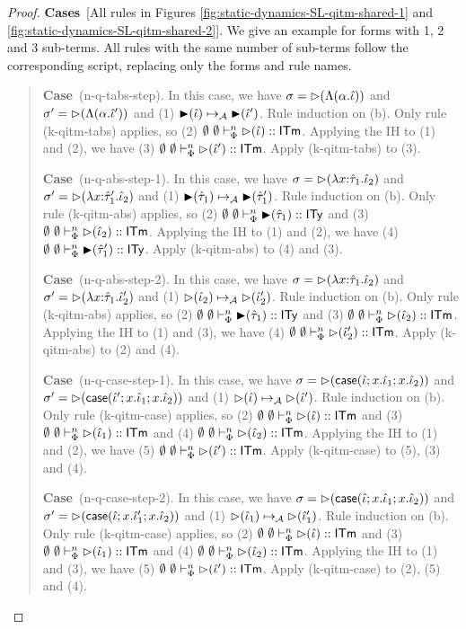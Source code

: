 \documentclass[12pt]{article}
\newcommand{\pfcase}[1]{\textbf{Case}~#1. }
\newcommand{\pfcases}[1]{\textbf{Cases}~#1. }
\begin{document}
\begin{proof}
\pfcases{[All rules in Figures \ref{fig:static-dynamics-SL-qitm-shared-1} and \ref{fig:static-dynamics-SL-qitm-shared-2}]} We give an example for forms with 1, 2 and 3 sub-terms. All rules with the same number of sub-terms follow the corresponding script, replacing only the forms and rule names.

\begin{quote}
    \pfcase{(n-q-tabs-step)} In this case, we have $\st=\sqitm{\iLam{\alpha}{\qitm}}$ and $\st'=\sqitm{\iLam{\alpha}{\qitm'}}$ and (1) $\qtstep{\qitm}{\qitm'}$. Rule induction on (b). Only rule (k-qitm-tabs) applies, so (2) $\sofkVX{\sqitm{\qitm}}{\kitm}$. Applying the IH to (1) and (2), we have (3) $\sofkVX{\sqitm{\qitm'}}{\kitm}$. Apply (k-qitm-tabs) to (3). 

    \pfcase{(n-q-abs-step-1)} In this case, we have $\st=\sqitm{\ilam{\qity_1}{x}{\qitm_2}}$ and $\st'=\sqitm{\ilam{\qity_1'}{x}{\qitm_2}}$ and (1) $\qtstep{\qity_1}{\qity_1'}$. Rule induction on (b). Only rule (k-qitm-abs) applies, so (2) $\sofkVX{\sqity{\qity_1}}{\kity}$ and (3) $\sofkVX{\sqitm{\qitm_2}}{\kitm}$. Applying the IH to (1) and (2), we have (4) $\sofkVX{\sqity{\qity_1'}}{\kity}$. Apply (k-qitm-abs) to (4) and (3).

    \pfcase{(n-q-abs-step-2)} In this case, we have $\st=\sqitm{\ilam{\qity_1}{x}{\qitm_2}}$ and $\st'=\sqitm{\ilam{\qity_1}{x}{\qitm_2'}}$ and (1) $\qstep{\qitm_2}{\qitm_2'}$. Rule induction on (b). Only rule (k-qitm-abs) applies, so (2) $\sofkVX{\sqity{\qity_1}}{\kity}$ and (3) $\sofkVX{\sqitm{\qitm_2}}{\kitm}$. Applying the IH to (1) and (3), we have (4) $\sofkVX{\sqitm{\qitm_2'}}{\kitm}$. Apply (k-qitm-abs) to (2) and (4).

    \pfcase{(n-q-case-step-1)} In this case, we have $\st=\sqitm{\icase{\qitm}{x}{\qitm_1}{x}{\qitm_2}}$ and $\st'=\sqitm{\icase{\qitm'}{x}{\qitm_1}{x}{\qitm_2}}$ and (1) $\qstep{\qitm}{\qitm'}$. Rule induction on (b). Only rule (k-qitm-case) applies, so (2) $\sofkVX{\sqitm{\qitm}}{\kitm}$ and (3) $\sofkVX{\sqitm{\qitm_1}}{\kitm}$ and (4) $\sofkVX{\sqitm{\qitm_2}}{\kitm}$. Applying the IH to (1) and (2), we have (5) $\sofkVX{\sqitm{\qitm'}}{\kitm}$. Apply (k-qitm-case) to (5), (3) and (4). 

    \pfcase{(n-q-case-step-2)} In this case, we have $\st=\sqitm{\icase{\qitm}{x}{\qitm_1}{x}{\qitm_2}}$ and $\st'=\sqitm{\icase{\qitm}{x}{\qitm_1'}{x}{\qitm_2}}$ and (1) $\qstep{\qitm_1}{\qitm_1'}$. Rule induction on (b). Only rule (k-qitm-case) applies, so (2) $\sofkVX{\sqitm{\qitm}}{\kitm}$ and (3) $\sofkVX{\sqitm{\qitm_1}}{\kitm}$ and (4) $\sofkVX{\sqitm{\qitm_2}}{\kitm}$. Applying the IH to (1) and (3), we have (5) $\sofkVX{\sqitm{\qitm'}}{\kitm}$. Apply (k-qitm-case) to (2), (5) and (4). 


\end{quote}
\end{proof}
\end{document}
